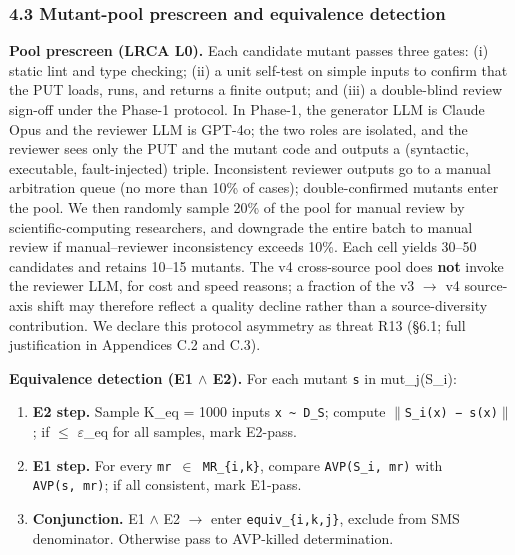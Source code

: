 \documentclass[review,12pt,authoryear]{elsarticle}
\providecommand{\tightlist}{\setlength{\itemsep}{0pt}\setlength{\parskip}{0pt}}
\begin{document}
\subsubsection{4.3 Mutant-pool prescreen and equivalence
detection}\label{mutant-pool-prescreen-and-equivalence-detection}

\textbf{Pool prescreen (LRCA L0).} Each candidate mutant passes three
gates: (i) static lint and type checking; (ii) a unit self-test on
simple inputs to confirm that the PUT loads, runs, and returns a finite
output; and (iii) a double-blind review sign-off under the Phase-1
protocol. In Phase-1, the generator LLM is Claude Opus and the reviewer
LLM is GPT-4o; the two roles are isolated, and the reviewer sees only
the PUT and the mutant code and outputs a (syntactic, executable,
fault-injected) triple. Inconsistent reviewer outputs go to a manual
arbitration queue (no more than 10\% of cases); double-confirmed mutants
enter the pool. We then randomly sample 20\% of the pool for manual
review by scientific-computing researchers, and downgrade the entire
batch to manual review if manual--reviewer inconsistency exceeds 10\%.
Each cell yields 30--50 candidates and retains 10--15 mutants. The v4
cross-source pool does \textbf{not} invoke the reviewer LLM, for cost
and speed reasons; a fraction of the v3 $\to$ v4 source-axis shift may
therefore reflect a quality decline rather than a source-diversity
contribution. We declare this protocol asymmetry as threat R13 (§6.1;
full justification in Appendices C.2 and C.3).

\textbf{Equivalence detection (E1 $\wedge$ E2).} For each mutant
\texttt{s\textquotesingle{}} in mut\_j(S\_i):

\begin{enumerate}
\def\labelenumi{\arabic{enumi}.}
\tightlist
\item
  \textbf{E2 step.} Sample K\_eq = 1000 inputs
  \texttt{x\ \textasciitilde{}\ D\_S}; compute
  \texttt{$\|$S\_i(x)\ −\ s\textquotesingle{}(x)$\|$}; if $\leq$ $\varepsilon$\_eq for all
  samples, mark E2-pass.
\item
  \textbf{E1 step.} For every \texttt{mr\ $\in$\ MR\_\{i,k\}}, compare
  \texttt{AVP(S\_i,\ mr)} with \texttt{AVP(s\textquotesingle{},\ mr)};
  if all consistent, mark E1-pass.
\item
  \textbf{Conjunction.} E1 $\wedge$ E2 $\to$ enter \texttt{equiv\_\{i,k,j\}},
  exclude from SMS denominator. Otherwise pass to AVP-killed
  determination.
\end{enumerate}
\end{document}
